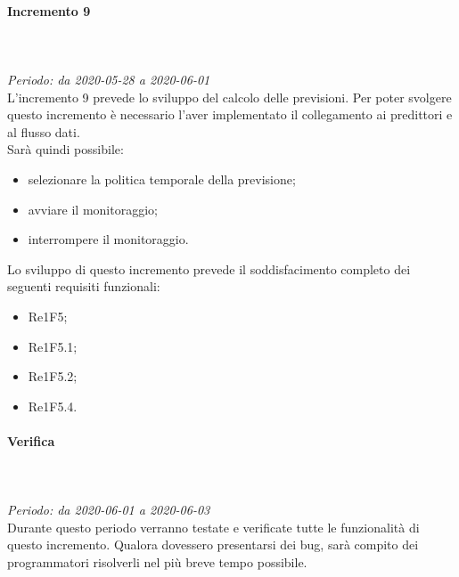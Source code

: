 \paragraph{Incremento 9}\mbox{} \\ \mbox{} \\ 
\textit{Periodo: da 2020-05-28 a 2020-06-01}\\
L’incremento 9 prevede lo sviluppo del calcolo delle previsioni. Per poter svolgere questo incremento è necessario l'aver implementato il collegamento ai predittori e al flusso dati. \\
Sarà quindi possibile:
\begin{itemize}
	\item selezionare la politica temporale della previsione;
	\item avviare il monitoraggio;
	\item interrompere il monitoraggio.
\end{itemize}
Lo sviluppo di questo incremento prevede il soddisfacimento completo dei seguenti requisiti funzionali:
\begin{itemize}
\item Re1F5;
\item Re1F5.1;
\item Re1F5.2;
\item Re1F5.4.
\end{itemize}
\paragraph*{Verifica}\mbox{} \\ \mbox{} \\ 
\textit{Periodo: da 2020-06-01 a 2020-06-03}\\
Durante questo periodo verranno testate e verificate tutte le funzionalità di questo incremento. Qualora dovessero presentarsi dei bug, sarà compito dei programmatori risolverli nel più breve tempo possibile.

